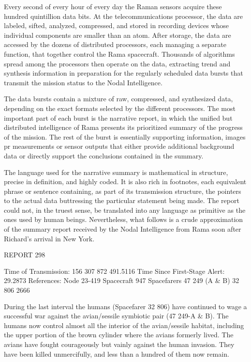 \documentclass[]{article}
\begin{document}
{{Every second of every hour of every day the Raman sensors acquire these hundred quintillion data bits. At the telecommunications processor, the data are labeled, sifted, analyzed, compressed, and stored in recording devices whose individual components are smaller than an atom. After storage, the data are accessed by the dozens of distributed processors, each managing a separate function, that together control the Rama spacecraft. Thousands of algorithms spread among the processors then operate on the data, extracting trend and synthesis information in preparation for the regularly scheduled data bursts that transmit the mission status to the Nodal Intelligence.

The data bursts contain a mixture of raw, compressed, and synthesized data, depending on the exact formats selected by the different processors. The most important part of each burst is the narrative report, in which the unified but distributed intelligence of Rama presents its prioritized summary of the progress of the mission. The rest of the burst is essentially supporting information, images pr measurements or sensor outputs that either provide additional background data or directly support the conclusions contained in the summary.

The language used for the narrative summary is mathematical in structure, precise in definition, and highly coded. It is also rich in footnotes, each equivalent phrase or sentence containing, as part of its transmission structure, the pointers to the actual data buttressing the particular statement being made. The report could not, in the truest sense, be translated into any language as primitive as the ones used by human beings. Nevertheless, what follows is a crude approximation of the summary report received by the Nodal Intelligence from Rama soon after Richard’s arrival in New York.

REPORT 298

Time of Transmission: 156 307 872 491.5116 Time Since First-Stage Alert: 29.2873 References: Node 23-419 Spacecraft 947 Spacefarers 47 249 (A \& B) 32 806 2666

During the last interval the humans (Spacefarer 32 806) have continued to wage a successful war against the avian/sessile symbiotic pair (47 249-A \& B). The humans now control almost all the interior of the avian/sessile habitat, including the upper portion of the brown cylinder where the avians formerly lived. The avians have fought courageously but vainly against the human invasion. They have been killed unmercifully, and less than a hundred of them now remain.

}}
\end{document}
